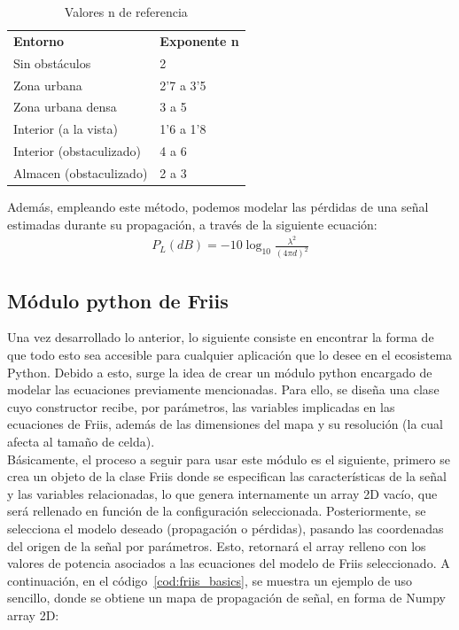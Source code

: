 \begin{table} [t]
    \centering
    \begin{tabular}{ll}
    \textbf{Entorno}            & \textbf{Exponente n} \\
    Sin obstáculos              & 2 \\
    Zona urbana                 & 2'7 a 3'5\\
    Zona urbana densa           & 3 a 5  \\
    Interior (a la vista)       & 1'6 a 1'8 \\
    Interior (obstaculizado)    & 4 a 6 \\
    Almacen (obstaculizado)     & 2 a 3 \\
    \end{tabular}
    \caption[Valores n de referencia]{Valores n de referencia}
    \label{table:ple_table}
\end{table}

Además, empleando este método, podemos modelar las pérdidas de una señal estimadas durante su propagación, a través de la siguiente ecuación:\\

\begin{align}
    P_L(dB) = -10 \log_{10} \frac{\lambda^2}{(4 \pi d)^2}
\end{align}

\subsection{Módulo python de Friis}
\label{subsec:friis-module}

Una vez desarrollado lo anterior, lo siguiente consiste en encontrar la forma de que todo esto sea accesible para cualquier aplicación que lo desee en el ecosistema Python. Debido a esto, surge la idea de crear un módulo python encargado de modelar las ecuaciones previamente mencionadas. Para ello, se diseña una clase cuyo constructor recibe, por parámetros, las variables implicadas en las ecuaciones de Friis, además de las dimensiones del mapa y su resolución (la cual afecta al tamaño de celda).\\

Básicamente, el proceso a seguir para usar este módulo es el siguiente, primero se crea un objeto de la clase Friis donde se especifican las características de la señal y las variables relacionadas, lo que genera internamente un array 2D vacío, que será rellenado en función de la configuración seleccionada. Posteriormente, se selecciona el modelo deseado (propagación o pérdidas), pasando las coordenadas del origen de la señal por parámetros. Esto, retornará el array relleno con los valores de potencia asociados a las ecuaciones del modelo de Friis seleccionado. A continuación, en el código~\ref{cod:friis_basics}, se muestra un ejemplo de uso sencillo, donde se obtiene un mapa de propagación de señal, en forma de Numpy array 2D:

